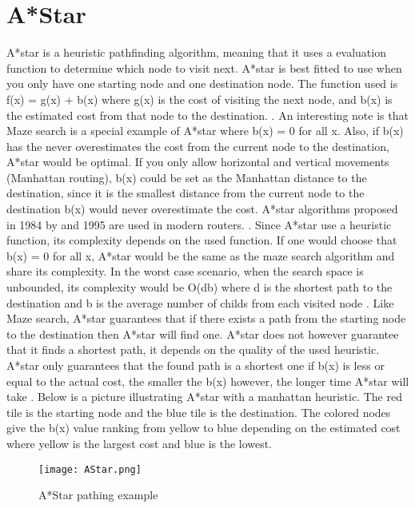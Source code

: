 \documentclass{kththesis}
\begin{document}
\section{A*Star}
A*star is a heuristic pathfinding algorithm, meaning that it uses a evaluation function to determine which node to visit next. A*star is best fitted to use when you only have one starting node and one destination node. The function used is f(x) = g(x) + b(x) where g(x) is the cost of visiting the next node, and b(x) is the estimated cost from that node to the destination. \parencite{redbloggames}. An interesting note is that Maze search is a special example of A*star where b(x) = 0 for all x. Also, if b(x) has the never overestimates the cost from the current node to the destination, A*star would be optimal. If you only allow horizontal and vertical movements (Manhattan routing), b(x) could be set as the Manhattan distance to the destination, since it is the smallest distance from the current node to the destination b(x) would never overestimate the cost. A*star algorithms proposed in 1984 by and 1995 are used in modern routers. \parencite{EDA_routing}.
Since A*star use a heuristic function, its complexity depends on the used function. If one would choose that b(x) = 0 for all x, A*star would be the same as the maze search algorithm and share its complexity. In the worst case scenario, when the search space is unbounded, its complexity would be O(db) where d is the shortest path to the destination and b is the average number of childs from each visited node \parencite{russell}. Like Maze search, A*star guarantees that if there exists a path from the starting node to the destination then A*star will find one. A*star does not however guarantee that it finds a shortest path, it depends on the quality of the used heuristic. A*star only guarantees that the found path is a shortest one if b(x) is less or equal to the actual cost, the smaller the b(x) however, the longer time A*star will take \parencite{stanford2}. Below is a picture illustrating A*star with a manhattan heuristic. The red tile is the starting node and the blue tile is the destination. The colored nodes give the b(x) value ranking from yellow to blue depending on the estimated cost where yellow is the largest cost and blue is the lowest.

\begin{figure}[h]
\texttt{[image: AStar.png]}
\caption{A*Star pathing example}
\end{figure}
\end{document}
